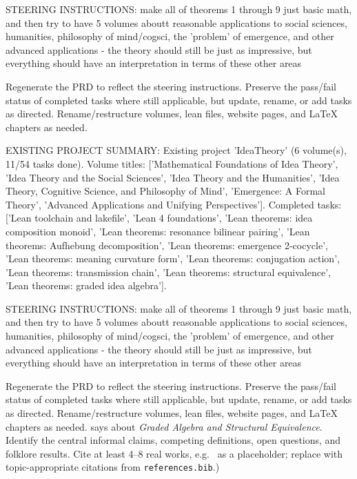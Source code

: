STEERING INSTRUCTIONS: make all of theorems 1 through 9 just basic math, and then try to have 5 volumes aboutt reasonable applications to social sciences, humanities, philosophy of mind/cogsci, the 'problem' of emergence, and other advanced applications - the theory should still be just as impressive, but everything should have an interpretation in terms of these other areas

Regenerate the PRD to reflect the steering instructions. Preserve the pass/fail status of completed tasks where still applicable, but update, rename, or add tasks as directed. Rename/restructure volumes, lean files, website pages, and LaTeX chapters as needed.

EXISTING PROJECT SUMMARY: Existing project 'IdeaTheory' (6 volume(s), 11/54 tasks done). Volume titles: ['Mathematical Foundations of Idea Theory', 'Idea Theory and the Social Sciences', 'Idea Theory and the Humanities', 'Idea Theory, Cognitive Science, and Philosophy of Mind', 'Emergence: A Formal Theory', 'Advanced Applications and Unifying Perspectives']. Completed tasks: ['Lean toolchain and lakefile', 'Lean 4 foundations', 'Lean theorems: idea composition monoid', 'Lean theorems: resonance bilinear pairing', 'Lean theorems: Aufhebung decomposition', 'Lean theorems: emergence 2-cocycle', 'Lean theorems: meaning curvature form', 'Lean theorems: conjugation action', 'Lean theorems: transmission chain', 'Lean theorems: structural equivalence', 'Lean theorems: graded idea algebra'].

STEERING INSTRUCTIONS: make all of theorems 1 through 9 just basic math, and then try to have 5 volumes aboutt reasonable applications to social sciences, humanities, philosophy of mind/cogsci, the 'problem' of emergence, and other advanced applications - the theory should still be just as impressive, but everything should have an interpretation in terms of these other areas

Regenerate the PRD to reflect the steering instructions. Preserve the pass/fail status of completed tasks where still applicable, but update, rename, or add tasks as directed. Rename/restructure volumes, lean files, website pages, and LaTeX chapters as needed. says about \emph{Graded Algebra and Structural Equivalence}.  Identify the
        central informal claims, competing definitions, open questions, and
        folklore results.  Cite at least 4--8 real works, e.g.\ \cite{
        lean4_tpil} as a placeholder; replace with topic-appropriate
        citations from \texttt{references.bib}.)

